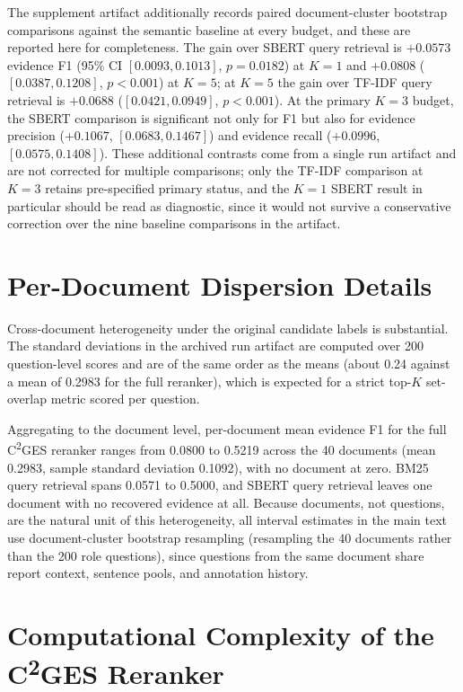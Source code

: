 \documentclass[11pt,letterpaper]{article}
\newcommand{\cges}{C\textsuperscript{2}GES}
\begin{document}
The supplement artifact additionally records paired document-cluster bootstrap comparisons against the semantic baseline at every budget, and these are reported here for completeness. The gain over SBERT query retrieval is $+0.0573$ evidence F1 (95\% CI $[0.0093, 0.1013]$, $p=0.0182$) at $K=1$ and $+0.0808$ ($[0.0387, 0.1208]$, $p<0.001$) at $K=5$; at $K=5$ the gain over TF-IDF query retrieval is $+0.0688$ ($[0.0421, 0.0949]$, $p<0.001$). At the primary $K=3$ budget, the SBERT comparison is significant not only for F1 but also for evidence precision ($+0.1067$, $[0.0683, 0.1467]$) and evidence recall ($+0.0996$, $[0.0575, 0.1408]$). These additional contrasts come from a single run artifact and are not corrected for multiple comparisons; only the TF-IDF comparison at $K=3$ retains pre-specified primary status, and the $K=1$ SBERT result in particular should be read as diagnostic, since it would not survive a conservative correction over the nine baseline comparisons in the artifact.

\section{Per-Document Dispersion Details}
\label{sec:s2}

Cross-document heterogeneity under the original candidate labels is substantial. The standard deviations in the archived run artifact are computed over 200 question-level scores and are of the same order as the means (about 0.24 against a mean of 0.2983 for the full reranker), which is expected for a strict top-$K$ set-overlap metric scored per question.

Aggregating to the document level, per-document mean evidence F1 for the full \cges{} reranker ranges from 0.0800 to 0.5219 across the 40 documents (mean 0.2983, sample standard deviation 0.1092), with no document at zero. BM25 query retrieval spans 0.0571 to 0.5000, and SBERT query retrieval leaves one document with no recovered evidence at all. Because documents, not questions, are the natural unit of this heterogeneity, all interval estimates in the main text use document-cluster bootstrap resampling (resampling the 40 documents rather than the 200 role questions), since questions from the same document share report context, sentence pools, and annotation history.

\section{Computational Complexity of the \cges{} Reranker}
\label{sec:s3}
\end{document}
